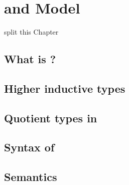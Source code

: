 \chapter{\hott and \og Model}



split this Chapter

\section{What is \hott?}


\section{Higher inductive types}

\section{Quotient types in \hott}


\section{Syntax of \wog}


\section{Semantics}